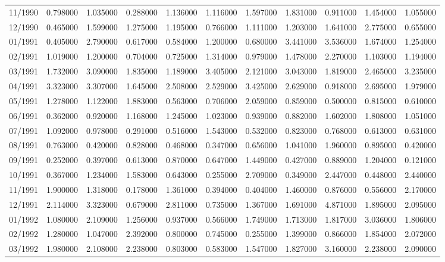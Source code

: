 \begin{tabular}{lrrrrrrrrrr}
11/1990 & 0.798000 & 1.035000 & 0.288000 & 1.136000 & 1.116000 & 1.597000 & 1.831000 & 0.911000 & 1.454000 & 1.055000 \\
12/1990 & 0.465000 & 1.599000 & 1.275000 & 1.195000 & 0.766000 & 1.111000 & 1.203000 & 1.641000 & 2.775000 & 0.655000 \\
01/1991 & 0.405000 & 2.790000 & 0.617000 & 0.584000 & 1.200000 & 0.680000 & 3.441000 & 3.536000 & 1.674000 & 1.254000 \\
02/1991 & 1.019000 & 1.200000 & 0.704000 & 0.725000 & 1.314000 & 0.979000 & 1.478000 & 2.270000 & 1.103000 & 1.194000 \\
03/1991 & 1.732000 & 3.090000 & 1.835000 & 1.189000 & 3.405000 & 2.121000 & 3.043000 & 1.819000 & 2.465000 & 3.235000 \\
04/1991 & 3.323000 & 3.307000 & 1.645000 & 2.508000 & 2.529000 & 3.425000 & 2.629000 & 0.918000 & 2.695000 & 1.979000 \\
05/1991 & 1.278000 & 1.122000 & 1.883000 & 0.563000 & 0.706000 & 2.059000 & 0.859000 & 0.500000 & 0.815000 & 0.610000 \\
06/1991 & 0.362000 & 0.920000 & 1.168000 & 1.245000 & 1.023000 & 0.939000 & 0.882000 & 1.602000 & 1.808000 & 1.051000 \\
07/1991 & 1.092000 & 0.978000 & 0.291000 & 0.516000 & 1.543000 & 0.532000 & 0.823000 & 0.768000 & 0.613000 & 0.631000 \\
08/1991 & 0.763000 & 0.420000 & 0.828000 & 0.468000 & 0.347000 & 0.656000 & 1.041000 & 1.960000 & 0.895000 & 0.420000 \\
09/1991 & 0.252000 & 0.397000 & 0.613000 & 0.870000 & 0.647000 & 1.449000 & 0.427000 & 0.889000 & 1.204000 & 0.121000 \\
10/1991 & 0.367000 & 1.234000 & 1.583000 & 0.643000 & 0.255000 & 2.709000 & 0.349000 & 2.447000 & 0.448000 & 2.440000 \\
11/1991 & 1.900000 & 1.318000 & 0.178000 & 1.361000 & 0.394000 & 0.404000 & 1.460000 & 0.876000 & 0.556000 & 2.170000 \\
12/1991 & 2.114000 & 3.323000 & 0.679000 & 2.811000 & 0.735000 & 1.367000 & 1.691000 & 4.871000 & 1.895000 & 2.095000 \\
01/1992 & 1.080000 & 2.109000 & 1.256000 & 0.937000 & 0.566000 & 1.749000 & 1.713000 & 1.817000 & 3.036000 & 1.806000 \\
02/1992 & 1.280000 & 1.047000 & 2.392000 & 0.800000 & 0.745000 & 0.255000 & 1.399000 & 0.866000 & 1.854000 & 2.072000 \\
03/1992 & 1.980000 & 2.108000 & 2.238000 & 0.803000 & 0.583000 & 1.547000 & 1.827000 & 3.160000 & 2.238000 & 2.090000 \\

\end{tabular}
